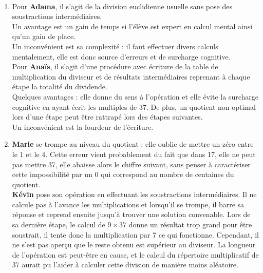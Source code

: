 \begin{corrige}
\ \\ [-5mm]
\begin{enumerate}
   \item Pour {\bf Adama}, il s'agit de la division euclidienne usuelle sans pose des soustractions intermédiaires. \\
   Un avantage est un gain de temps si l'élève est expert en calcul mental ainsi qu'un gain de place. \\
   Un inconvénient est sa complexité : il faut effectuer divers calculs mentalement, elle est donc source d'erreurs et de surcharge cognitive. \\ 
   Pour {\bf Anaïs}, il s'agit d'une procédure avec écriture de la table de multiplication du diviseur et de résultats intermédiaires reprenant à chaque étape la totalité du dividende. \\
   Quelques avantages : elle donne du sens à l'opération et elle évite la surcharge cognitive en ayant écrit les multiples de 37. De plus, un quotient non optimal lors d'une étape peut être rattrapé lors des étapes suivantes. \\
   Un inconvénient est la lourdeur de l'écriture.
   \item {\bf Marie} se trompe au niveau du quotient : elle oublie de mettre un \og zéro \fg{} entre le 1 et le 4. Cette erreur vient probablement du fait que dans 17, elle ne peut pas mettre 37, elle abaisse alors le chiffre suivant, sans penser à caractériser cette impossibilité par un 0 qui correspond au nombre de centaines du quotient. \\   
   {\bf Kévin} pose son opération en effectuant les soustractions intermédiaires. Il ne calcule pas à l'avance les multiplications et lorsqu'il se trompe, il barre sa réponse et reprend ensuite jusqu'à trouver une solution convenable. Lors de sa dernière étape, le calcul de $9\times37$ donne un résultat trop grand pour être soustrait, il tente donc la multiplication par 7 ce qui fonctionne. Cependant, il ne s'est pas aperçu que le reste obtenu est  supérieur au diviseur. La longueur de l'opération est peut-être en cause, et le calcul du répertoire multiplicatif de 37 aurait pu l'aider à calculer cette division de manière moins aléatoire.
\end{enumerate}
\end{corrige}

\bigskip

